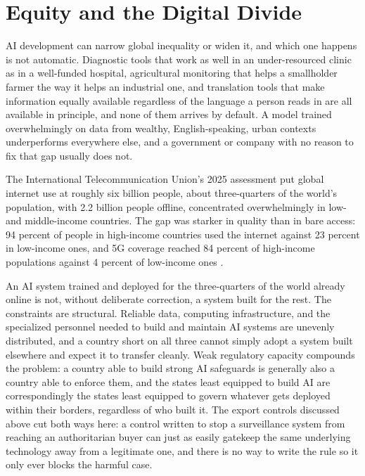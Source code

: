 \section{Equity and the Digital Divide}
\label{sec:10.9}
AI development can narrow global inequality or widen it, and which one happens is not automatic. Diagnostic tools that work as well in an under-resourced clinic as in a well-funded hospital, agricultural monitoring that helps a smallholder farmer the way it helps an industrial one, and translation tools that make information equally available regardless of the language a person reads in are all available in principle, and none of them arrives by default. A model trained overwhelmingly on data from wealthy, English-speaking, urban contexts underperforms everywhere else, and a government or company with no reason to fix that gap usually does not.

\begin{esbox}
The International Telecommunication Union's 2025 assessment put global internet use at roughly six billion people, about three-quarters of the world's population, with 2.2 billion people offline, concentrated overwhelmingly in low- and middle-income countries. The gap was starker in quality than in bare access: 94 percent of people in high-income countries used the internet against 23 percent in low-income ones, and 5G coverage reached 84 percent of high-income populations against 4 percent of low-income ones \autocite{itu2025facts}.

\end{esbox}
An AI system trained and deployed for the three-quarters of the world already online is not, without deliberate correction, a system built for the rest. The constraints are structural. Reliable data, computing infrastructure, and the specialized personnel needed to build and maintain AI systems are unevenly distributed, and a country short on all three cannot simply adopt a system built elsewhere and expect it to transfer cleanly. Weak regulatory capacity compounds the problem: a country able to build strong AI safeguards is generally also a country able to enforce them, and the states least equipped to build AI are correspondingly the states least equipped to govern whatever gets deployed within their borders, regardless of who built it. The export controls discussed above cut both ways here: a control written to stop a surveillance system from reaching an authoritarian buyer can just as easily gatekeep the same underlying technology away from a legitimate one, and there is no way to write the rule so it only ever blocks the harmful case.

